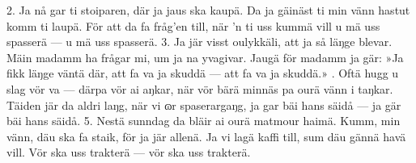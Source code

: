 \setlength{\columnsep}{0.2cm}
\begin{multicols}{2}
2.  Ja nå gar ti stoiparen,
    där ja jaus ska kaupä.
    Da ja gäinäst ti min vänn
    hastut komm ti laupä.
    För att da fa fråg’en till,
    när ’n ti uss kummä vill
    u mä uss spasserä — u mä uss spasserä.
3.  Ja jär visst oulykkäli,
    att ja så läŋge blevar.
    Mäin madamm ha frågar mi,
    um ja na yvagivar.
    Jaugä för madamm ja gär:
    »Ja fikk läŋge väntä där,
    att fa va ja skuddä — att fa va ja skuddä.»
\vfill{}.  Oftä hugg u slag vör va —
    därpa vör ai aŋkar,
    när vör bärä minnäs pa
    ourä vänn i taŋkar.
    Täiden jär da aldri laŋg,
    när vi ɷr spaserargaŋg,
    ja gar bäi hans säidå — ja gär bäi hans säidå.
5.  Nestä sunndag da bläir ai
    ourä matmour haimä.
    Kumm, min vänn, däu ska fa staik,
    för ja jär allenä.
    Ja vi lagä kaffi till,
    sum däu gännä havä vill.
    Vör ska uss trakterä — vör ska uss trakterä.
\end{multicols}
